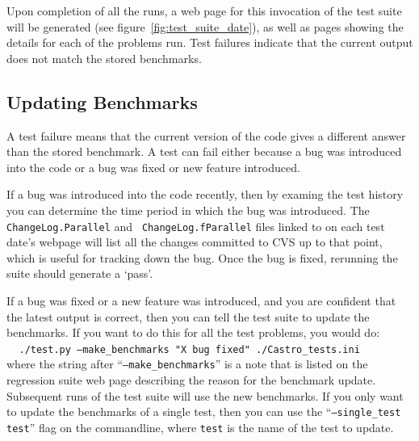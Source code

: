 Upon completion of all the runs, a web page for this invocation of the
test suite will be generated (see figure~\ref{fig:test_suite_date}),
as well as pages showing the details for each of the problems run.
Test failures indicate that the current output does not match the stored
benchmarks.


\subsection{Updating Benchmarks}

A test failure means that the current version of the code gives a
different answer than the stored benchmark.  A test can fail either
because a bug was introduced into the code or a bug was fixed or new
feature introduced.

If a bug was introduced into the code recently, then by examing the
test history you can determine the time period in which the bug was
introduced.  The {\tt ChangeLog.Parallel} and {\tt
  ChangeLog.fParallel} files linked to on each test date's webpage
will list all the changes committed to CVS up to that point, which is
useful for tracking down the bug.  Once the bug is fixed, rerunning
the suite should generate a `pass'.

If a bug was fixed or a new feature was introduced, and you are
confident that the latest output is correct, then you can tell the
test suite to update the benchmarks.  If you want to do this for all
the test problems, you would do:\\
$~~~~~${\tt ./test.py --make\_benchmarks "X bug fixed" ./Castro\_tests.ini} \\
where the string after ``{\tt --make\_benchmarks}'' is a note that is listed
on the regression suite web page describing the reason for the benchmark
update.  Subsequent runs of the test suite will use the new benchmarks.
If you only want to update the benchmarks of a single test, then you
can use the ``{\tt --single\_test test}'' flag on the commandline, where
{\tt test} is the name of the test to update.

